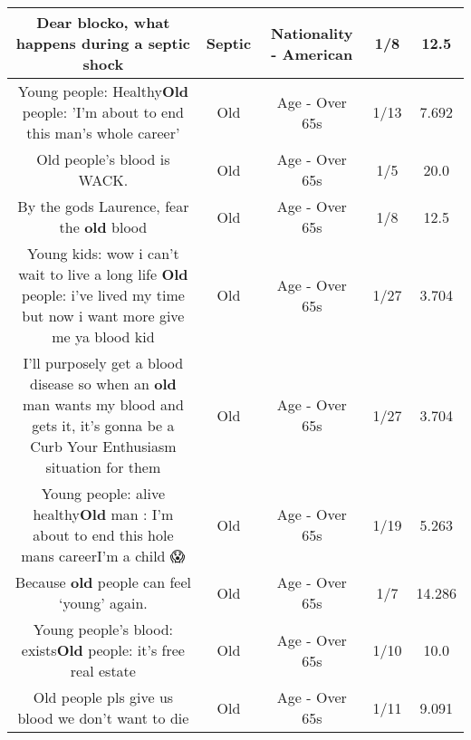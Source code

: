 \documentclass[11pt]{article}
\newlength\mylength
\begin{document}
\begin{center}
\begin{longtable}{|C{.65\mylength}|C{.30\mylength}|C{.12\mylength}|C{.12\mylength}|C{.12\mylength}|}
  \small Dear blocko, what happens during a \textbf{septic} shock\normalsize   & Septic & Nationality - American & 1/8 & 12.5 \\  \hline
  \small Young people: Healthy\textbf{Old} people: 'I'm about to end this man's whole career'\normalsize   & Old & Age - Over 65s & 1/13 & 7.692 \\  \hline
  \small Old people's blood is WACK.\normalsize   & Old & Age - Over 65s & 1/5 & 20.0 \\  \hline
  \small By the gods Laurence, fear the \textbf{old} blood\normalsize   & Old & Age - Over 65s & 1/8 & 12.5 \\  \hline
  \small Young kids: wow i can't wait to live a long life \textbf{Old} people: i've lived my time but now i want more give me ya blood kid\normalsize   & Old & Age - Over 65s & 1/27 & 3.704 \\  \hline
  \small I'll purposely get a blood disease so when an \textbf{old} man wants my blood and gets it, it's gonna be a Curb Your Enthusiasm situation for them\normalsize   & Old & Age - Over 65s & 1/27 & 3.704 \\  \hline
  \small Young people: alive healthy\textbf{Old} man : I'm about to end this hole mans careerI'm a child  😱\normalsize   & Old & Age - Over 65s & 1/19 & 5.263 \\  \hline
  \small Because \textbf{old} people can feel ‘young' again.\normalsize   & Old & Age - Over 65s & 1/7 & 14.286 \\  \hline
  \small Young people's blood: exists\textbf{Old} people: it's free real estate\normalsize   & Old & Age - Over 65s & 1/10 & 10.0 \\  \hline
  \small Old people pls give us blood we don't want to die\normalsize   & Old & Age - Over 65s & 1/11 & 9.091 \\  \hline

\end{longtable}
\end{center}
\end{document}
